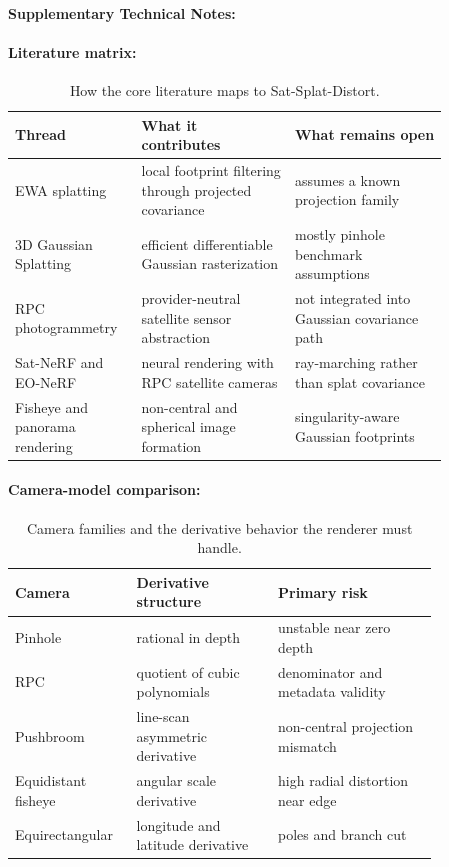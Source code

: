 \documentclass{article}
\begin{document}
\paragraph{Supplementary Technical Notes:}

\paragraph{Literature matrix:}

\begin{table}[t]
\centering
\caption{How the core literature maps to Sat-Splat-Distort.}
\begin{tabular}{@{}p{0.22\linewidth}p{0.32\linewidth}p{0.32\linewidth}@{}}
\toprule
\textbf{Thread} & \textbf{What it contributes} & \textbf{What remains open}\\
\midrule
EWA splatting & local footprint filtering through projected covariance & assumes a known projection family\\
3D Gaussian Splatting & efficient differentiable Gaussian rasterization & mostly pinhole benchmark assumptions\\
RPC photogrammetry & provider-neutral satellite sensor abstraction & not integrated into Gaussian covariance path\\
Sat-NeRF and EO-NeRF & neural rendering with RPC satellite cameras & ray-marching rather than splat covariance\\
Fisheye and panorama rendering & non-central and spherical image formation & singularity-aware Gaussian footprints\\
\bottomrule
\end{tabular}
\end{table}

\paragraph{Camera-model comparison:}

\begin{table}[t]
\centering
\caption{Camera families and the derivative behavior the renderer must handle.}
\begin{tabular}{@{}p{0.20\linewidth}p{0.30\linewidth}p{0.34\linewidth}@{}}
\toprule
\textbf{Camera} & \textbf{Derivative structure} & \textbf{Primary risk}\\
\midrule
Pinhole & rational in depth & unstable near zero depth\\
RPC & quotient of cubic polynomials & denominator and metadata validity\\
Pushbroom & line-scan asymmetric derivative & non-central projection mismatch\\
Equidistant fisheye & angular scale derivative & high radial distortion near edge\\
Equirectangular & longitude and latitude derivative & poles and branch cut\\
\bottomrule
\end{tabular}
\end{table}
\end{document}

